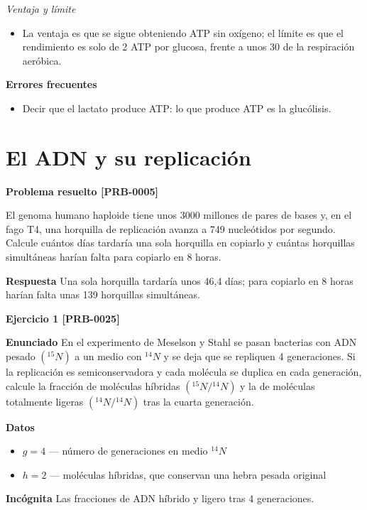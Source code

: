 \documentclass{book}
\begin{document}
\noindent\textit{Ventaja y límite}
\begin{itemize}
\item La ventaja es que se sigue obteniendo ATP sin oxígeno; el límite es que el rendimiento es solo de 2 ATP por glucosa, frente a unos 30 de la respiración aeróbica.
\end{itemize}

\noindent\textbf{Errores frecuentes}
\begin{itemize}
\item Decir que el lactato produce ATP: lo que produce ATP es la glucólisis.
\end{itemize}

\section{El ADN y su replicación}

\noindent\textbf{Problema resuelto [PRB-0005]}

El genoma humano haploide tiene unos 3000 millones de pares de bases y, en el fago T4, una horquilla de replicación avanza a 749 nucleótidos por segundo. Calcule cuántos días tardaría una sola horquilla en copiarlo y cuántas horquillas simultáneas harían falta para copiarlo en 8 horas.


\noindent\textbf{Respuesta}
Una sola horquilla tardaría unos 46,4 días; para copiarlo en 8 horas harían falta unas 139 horquillas simultáneas.


\noindent\textbf{Ejercicio 1 [PRB-0025]}

\noindent\textbf{Enunciado}
En el experimento de Meselson y Stahl se pasan bacterias con ADN pesado \(({}^{15}N)\) a un medio con \({}^{14}N\) y se deja que se repliquen 4 generaciones. Si la replicación es semiconservadora y cada molécula se duplica en cada generación, calcule la fracción de moléculas híbridas \(({}^{15}N/{}^{14}N)\) y la de moléculas totalmente ligeras \(({}^{14}N/{}^{14}N)\) tras la cuarta generación.


\noindent\textbf{Datos}
\begin{itemize}
\item $g = 4$ — número de generaciones en medio \({}^{14}N\)
\item $h = 2$ — moléculas híbridas, que conservan una hebra pesada original
\end{itemize}

\noindent\textbf{Incógnita}
Las fracciones de ADN híbrido y ligero tras 4 generaciones.
\end{document}
